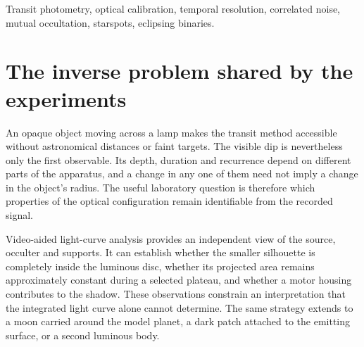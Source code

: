 \begin{abstract}
A laboratory transit is an inverse problem involving visible area, surface brightness and detector response. A common measurement model connects phone, SensorTag, photocell--multimeter and Nano examples to tests of temporal resolution and to more complex occultations. Local deficits in three independent acquisition examples are 3.95, 3.99 and 4.00\%; a shallow Nano sequence gives 4.26\%, whereas a whole-record extrema estimator gives 19.30\%. A separate sampling example shows why a nominally adequate cadence can still miss a short feature: six of sixteen coarse sampling phases contain no reading in a half-second decrement. Planet--moon overlap and the occultation of a dark source patch both produce upward anomalies, but through different changes in the brightness integral. Their example contrasts are 1.48 and 2.92 percentage points, respectively. A sequence with two luminous bodies adds unequal eclipse depths of 31.05 and 10.49\% and a 29.995-s recurrence estimate. These quantities support different physical inferences; none permits a universal conversion from a light-curve minimum to an object radius.
\end{abstract}
\begin{IEEEkeywords}
Transit photometry, optical calibration, temporal resolution, correlated noise, mutual occultation, starspots, eclipsing binaries.
\end{IEEEkeywords}

\section{The inverse problem shared by the experiments}
An opaque object moving across a lamp makes the transit method accessible without astronomical distances or faint targets. The visible dip is nevertheless only the first observable. Its depth, duration and recurrence depend on different parts of the apparatus, and a change in any one of them need not imply a change in the object's radius. The useful laboratory question is therefore which properties of the optical configuration remain identifiable from the recorded signal.

Video-aided light-curve analysis\cite{transit2024} provides an independent view of the source, occulter and supports. It can establish whether the smaller silhouette is completely inside the luminous disc, whether its projected area remains approximately constant during a selected plateau, and whether a motor housing contributes to the shadow. These observations constrain an interpretation that the integrated light curve alone cannot determine. The same strategy extends to a moon carried around the model planet\cite{exomoonlesson2023}, a dark patch attached to the emitting surface, or a second luminous body.

